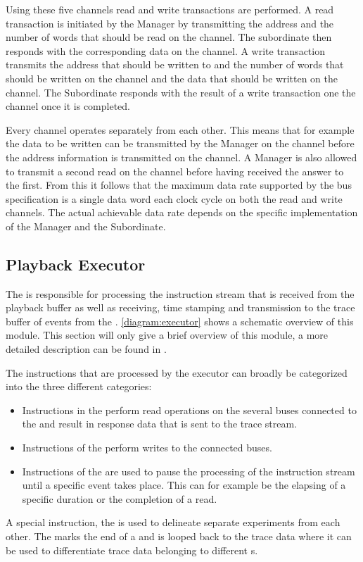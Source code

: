 Using these five channels read and write transactions are performed. A read transaction is initiated by the Manager by transmitting the address and the number of words that should be read on the \AR{} channel. The subordinate then responds with the corresponding data on the \R{} channel. A write transaction transmits the address that should be written to and the number of words that should be written on the \AW{} channel  and the data that should be written on the \W{} channel. The Subordinate responds with the result of a write transaction one the \B{} channel once it is completed.

Every channel operates separately from each other. This means that for example the data to be written can be transmitted by the Manager on the \W{} channel before the address information is transmitted on the \AW{} channel. A Manager is also allowed to transmit a second read on the \AR{} channel before having received the answer to the first.
From this it follows that the maximum data rate supported by the bus specification is a single data word each clock cycle on both the read and write channels. The actual achievable data rate depends on the specific implementation of the Manager and the Subordinate.

\subsection{Playback Executor}\label{sec:pb_exec}
The \pbexec{} is responsible for processing the instruction stream that is received from the playback buffer as well as receiving, time stamping and transmission to the trace buffer of events from the \ASIC{}. \autoref{diagram:executor} shows a schematic overview of this module. This section will only give a brief overview of this module, a more detailed description can be found in \autocite{ref:pb_exec}.

The instructions that are processed by the executor can broadly be categorized into the three different categories:
\begin{itemize}
\item Instructions in the \readCat{} perform read operations on the several buses connected to the \pbexec{} and result in response data that is sent to the trace stream.
\item Instructions of the \writeCat{} perform writes to the connected buses.
\item Instructions of the \waitCat{} are used to pause the processing of the instruction stream until a specific event takes place. This can for example be the elapsing of a specific duration or the completion of a read.
\end{itemize}
A special instruction, the \haltInstr{} is used to delineate separate experiments from each other. The \haltInstr{} marks the end of a \PlaybackProgram{} and is looped back to the trace data where it can be used to differentiate trace data belonging to different \PlaybackProgram{}s.

